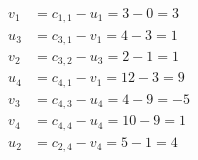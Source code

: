 \[
\begin{aligned}
v_{1} &= c_{1,1} - u_{1} = 3 - 0 = 3 \\
u_{3} &= c_{3,1} - v_{1} = 4 - 3 = 1 \\
v_{2} &= c_{3,2} - u_{3} = 2 - 1 = 1 \\
u_{4} &= c_{4,1} - v_{1} = 12 - 3 = 9 \\
v_{3} &= c_{4,3} - u_{4} = 4 - 9 = -5 \\
v_{4} &= c_{4,4} - u_{4} = 10 - 9 = 1 \\
u_{2} &= c_{2,4} - v_{4} = 5 - 1 = 4 \\
\end{aligned}
\]

